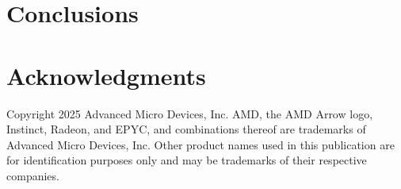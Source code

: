 \documentclass[acmtog,natbib=false]{acmart}
\begin{document}

\section{Conclusions}
\label{sec:Conclusions}




\section*{Acknowledgments}
Copyright 2025 Advanced Micro Devices, Inc.
AMD, the AMD Arrow logo, Instinct, Radeon, and EPYC, and combinations thereof are trademarks of Advanced Micro Devices, Inc.
Other product names used in this publication are for identification purposes only and may be trademarks of their respective companies.

\printbibliography
\end{document}
